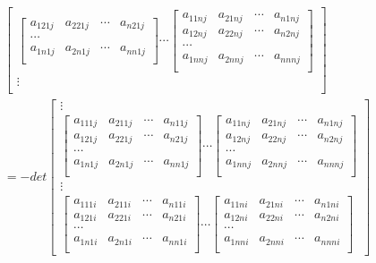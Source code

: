 \documentclass[twoside,a4paper,CCT]{cctart}   %
\begin{document}
\begin{list}{}
\begin{align*}
\begin{bmatrix}
\begin{bmatrix}
  a_{121j}& a_{221j}&\cdots&a_{n21j}\\
   \cdots\\
   a_{1n1j}& a_{2n1j}&\cdots&a_{nn1j}\\
   \end{bmatrix}
\cdots
\begin{bmatrix}
  a_{11nj}& a_{21nj}&\cdots&a_{n1nj}\\
  a_{12nj}& a_{22nj}&\cdots&a_{n2nj}\\
   \cdots\\
   a_{1nnj }& a_{2nnj}&\cdots&a_{nnnj}\\
   \end{bmatrix}\\
\vdots\\
    \end{bmatrix}\\
=-det
  \begin{bmatrix}
\vdots\\
 \begin{bmatrix}
   a_{111j}& a_{211j}&\cdots&a_{n11j}\\
   a_{121j}& a_{221j}&\cdots&a_{n21j}\\
    \cdots\\
   a_{1n1j}& a_{2n1j}&\cdots&a_{nn1j}\\
   \end{bmatrix}
\cdots
\begin{bmatrix}
  a_{11nj}& a_{21nj}&\cdots&a_{n1nj}\\
  a_{12nj}& a_{22nj}&\cdots&a_{n2nj}\\
  \cdots\\
  a_{1nnj }& a_{2nnj}&\cdots&a_{nnnj}\\
  \end{bmatrix}\\
\vdots\\
 \begin{bmatrix}
   a_{111i}& a_{211i}&\cdots&a_{n11i}\\
   a_{121i}& a_{221i}&\cdots&a_{n21i}\\
 \cdots\\
a_{1n1i}& a_{2n1i}&\cdots&a_{nn1i}\\
\end{bmatrix}
\cdots
\begin{bmatrix}
  a_{11ni}& a_{21ni}&\cdots&a_{n1ni}\\
  a_{12ni}& a_{22ni}&\cdots&a_{n2ni}\\
 \cdots\\
  a_{1nni}& a_{2nni}&\cdots&a_{nnni}\\

\end{bmatrix}
\end{bmatrix}
\end{align*}
\end{list}
\end{document}
